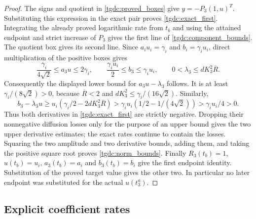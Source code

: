 \begin{proof}
The signs and quotient in \eqref{tgdc:proved_boxes} give
$y=-P_3(1,u)^T$. Substituting this expression in the exact pair proves
\eqref{tgdc:exact_first}. Integrating the already proved logarithmic
rate from $t_b$ and using the attained endpoint and strict increase
of $P_3$ gives the first line of \eqref{tgdc:component_bounds}.
The quotient box gives its second line. Since $a_i u_i=\gamma_i$
and $b_i=\gamma_i u_i$, direct multiplication of the positive boxes
gives
\[
 \frac{\gamma_i}{4\sqrt2}\leq a_3u\leq2\gamma_i,
 \qquad
 \frac{\gamma_i u_i}{2}\leq b_3\leq\gamma_i u_i,
 \qquad 0<\lambda_3\leq dK_3^2\overline R.
\]
Consequently the displayed lower bound for $a_3u-\lambda_3$ follows.
It is at least $\gamma_i/(8\sqrt2)>0$, because
$\overline R<2$ and $dK_3^2\leq\gamma_i/(16\sqrt2)$.
Similarly,
\[
 b_3-\lambda_3u
 \geq u_i(\gamma_i/2-2dK_3^2\overline R)
 >\gamma_i u_i(1/2-1/(4\sqrt2))
 >\gamma_i u_i/4>0.
\]
Thus both derivatives in \eqref{tgdc:exact_first} are strictly negative.
Dropping their nonnegative diffusion losses only for the purpose of
an upper bound gives the two upper derivative estimates; the exact
rates continue to contain the losses. Squaring the two amplitude and
two derivative bounds, adding them, and taking the positive square
root proves \eqref{tgdc:norm_bounds}. Finally $R_3(t_b)=1$,
$u(t_b)=u_i$, $a_3(t_b)=a_i$ and $b_3(t_b)=b_i$ give the first
endpoint identity. Substitution of the proved target value gives
the other two. In particular no later endpoint was substituted for
the actual $u(t_3^a)$.
\end{proof}

\subsection{Explicit coefficient rates}

